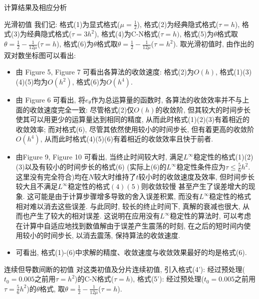 \documentclass{article}
\begin{document}
\begin{section}{计算结果及相应分析}
\begin{subsection}{光滑初值}
    我们记: 格式(1)为显式格式($\mu=\frac{1}{2}$), 格式(2)为经典隐式格式($\tau=h$), 格式(3)为经典隐式格式($\tau=3h^2$), 格式(4)为C-N格式($\tau=h)$, 格式(5)为$\theta$格式取$\theta=\frac{1}{2}-\frac{1}{12\mu}$($\tau=h$), 格式(6)为$\theta$格式取$\theta=\frac{1}{2}-\frac{1}{12\mu}$($\tau=h^2$).
    取光滑初值时, 由作出的双对数坐标图可以看出:
    \begin{itemize}
        \item 由 Figure 5, Figure 7 可看出各算法的收敛速度: 格式(2)为$O(h)$, 格式(1)(3)(4)(5)均为$O(h^2)$, 格式(6)为$O(h^4)$.
        \item 由 Figure 6 可看出, 将$e_\theta$作为总运算量的函数时, 各算法的收敛效率并不与上面的收敛速度完全一致: 尽管格式(2)仅$O(h)$的收敛阶, 但其较大的时间步长使其可以用更少的运算量达到相同的精度, 从而此时格式(1)(2)(3)有着相近的收敛效率; 
        而对格式(6), 尽管其依然使用较小的时间步长, 但有着更高的收敛阶$O(h^4)$, 从而此时格式(4)(5)(6)有着相近的收敛效率且快于前者.
        \item 由Figure 9, Figure 10 可看出, 当终止时间较大时, 满足$L^\infty$稳定性的格式(1)(2)(3)以及有较小的时间步长的格式(6) (实际上(6)的$L^\infty$稳定性条件应为$\tau\leq \frac{5}{6}h^2$. 这里没有完全符合)均在$N$较大时维持了$t$较小时的收敛速度及效率, 但时间步长较大且不满足$L^\infty$稳定性的格式$(4)(5)$则收敛较慢
        甚至产生了误差增大的现象. 这可能是由于计算步骤增多导致的舍入误差积累, 而没有$L^\infty$稳定性的格式相对难以消去这些误差. 与此同时, 较长的终止时间下, 真解的衰减也很大, 从而也产生了较大的相对误差. 这说明在应用没有$L^\infty$稳定性的算法时, 可以考虑在计算中自适应地找到数值解由于误差产生震荡的时刻, 在之后的短时间内使用较小的时间步长, 以消去震荡, 保持算法的收敛速度.
        \item 可看出, 格式(1)-(6)中求解的精度、收敛速度与收敛效果最好的均是格式(6).
    \end{itemize}
\end{subsection}

\newpage
\begin{subsection}{连续但导数间断的初值}
    对这类初值及分片连续初值, 引入格式(4'): 经过预处理($t_0=0.005$之前用$\tau=h^2$)的C-N格式($\tau=h)$, 格式(5'): 经过预处理($t_0=0.005$之前用$\tau=\frac{5}{6}h^2$)的$\theta$格式, 取$\theta=\frac{1}{2}-\frac{1}{12\mu}$($\tau=h$).
\begin{figure}[!htbp]
        

\end{figure}
\end{subsection}
\end{section}
\end{document}
